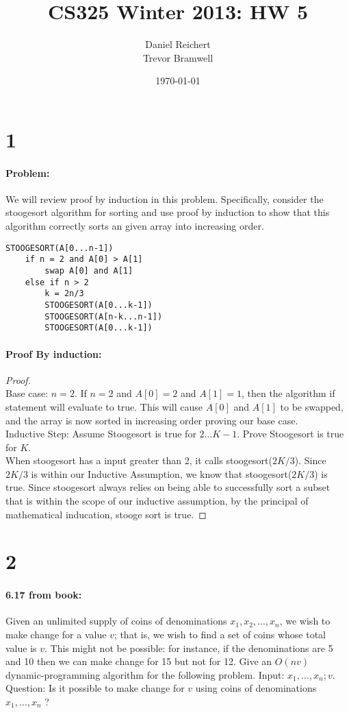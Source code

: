 \documentclass[12pt]{article}
\title{CS325 Winter 2013: HW 5}
\author{
    Daniel Reichert \\
    Trevor Bramwell \\
}
\date{\today}
\newcommand{\BigO}[1]{\ensuremath{O(#1)}}
\begin{document}
\maketitle
\section*{1}
\paragraph{Problem:}
We will review proof by induction in this problem. Specifically, consider the
stoogesort algorithm for sorting and use proof by induction to show that this
algorithm correctly sorts an given array into increasing order.
\begin{lstlisting}[mathescape]
STOOGESORT(A[0...n-1])
    if n = 2 and A[0] > A[1]
        swap A[0] and A[1]
    else if n > 2
        k = 2n/3
        STOOGESORT(A[0...k-1])
        STOOGESORT(A[n-k...n-1])
        STOOGESORT(A[0...k-1])
\end{lstlisting}
\paragraph{Proof By induction:}
\begin{proof}
\\Base case: $n = 2$.
If $n=2$ and $A[0] = 2$ and $A[1] = 1$, then the algorithm if statement
will evaluate to true.  This will cause $A[0]$ and $A[1]$ to be swapped,
and the array is now sorted in increasing order proving our base case.
\\
Inductive Step:
Assume Stoogesort is true for $2...K-1$.
Prove Stoogesort is true for $K$.
\\
When stoogesort has a input greater than 2, it calls stoogesort($2K/3$).
Since $2K/3$ is within our Inductive Assumption, we know that
stoogesort($2K/3$) is true.  Since stoogesort always relies on being
able to successfully sort a subset that is within the scope of our
inductive assumption, by the principal of mathematical inducation,
stooge sort is true.
\end{proof}

\section*{2}
\paragraph{6.17 from book:}
Given an unlimited supply of coins of denominations $x_1 , x_2 , \dots ,
x_n$, we wish to make change for a value $v$; that is, we wish to find a
set of coins whose total value is $v$. This might not be possible: for
instance, if the denominations are 5 and 10 then we can make change for
15 but not for 12.  Give an $\BigO{nv}$ dynamic-programming algorithm
for the following problem.  Input: $x_1 , \dots , x_n ; v$.  Question:
Is it possible to make change for $v$ using coins of denominations $x_1
, \dots , x_n$ ?
\end{document}
